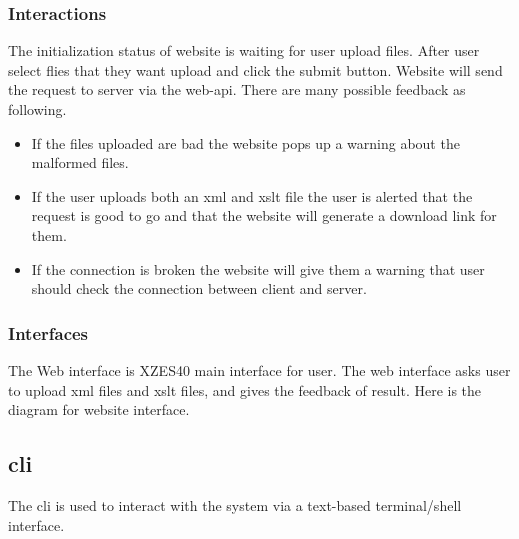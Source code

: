 \subsubsection{Interactions}

The initialization status of website is waiting for user upload files.
After user select flies that they want upload and click the submit button.
Website will send the request to server via the \gls{web-api}.
There are many possible feedback as following.

\begin{itemize}
    \item If the files uploaded are bad the website pops up a warning about the malformed files.
    \item  If the user uploads both an \gls{xml} and \gls{xslt} file the user is alerted that the request is good to go and that the website will generate a download link for them.
    \item If the connection is broken the website will give them a warning that user should check the connection between client and server.
\end{itemize}

\subsubsection{Interfaces}

The Web interface is XZES40 main interface for user.
The web interface asks user to upload \gls{xml} files and \gls{xslt} files, and gives the feedback of result.
Here is the diagram for website interface.


\subsection{\gls{cli}}
\label{cli}

The \gls{cli} is used to interact with the system via a text-based terminal/shell interface.


